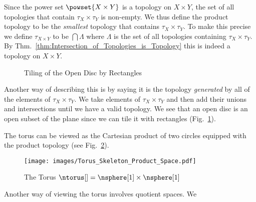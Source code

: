 \documentclass{book}                                                           %
\begin{document}
                Since the power set $\powset{X\times{Y}}$ is a topology on
                $X\times{Y}$, the set of all topologies that contain
                $\tau_{X}\times\tau_{Y}$ is non-empty. We thus define the
                product topology to be the \textit{smallest} topology that
                contains $\tau_{X}\times\tau_{Y}$. To make this precise we
                define $\tau_{X\times{Y}}$ to be $\bigcap\Lambda$ where
                $\Lambda$ is the set of all topologies containing
                $\tau_{X}\times\tau_{Y}$. By
                Thm.~\ref{thm:Intersection_of_Topologies_is_Topology} this is
                indeed a topology on $X\times{Y}$.%
                \begin{figure}[H]
                    \centering
                    \captionsetup{type=figure}
                    \resizebox{!}{0.8\height}{%
                    }
                    \caption{Tiling of the Open Disc by Rectangles}
                    \label{fig:Tiling_Open_Disc_by_Rectangles}
                \end{figure}
                Another way of describing this is by saying it is the topology
                \textit{generated} by all of the elements of
                $\tau_{X}\times\tau_{Y}$. We take elements of
                $\tau_{X}\times\tau_{Y}$ and then add their unions and
                intersections until we have a valid topology. We see that an
                open disc is an open subset of the plane since we can tile it
                with rectangles (Fig.~\ref{fig:Tiling_Open_Disc_by_Rectangles}).
                \begin{example}
                    The torus can be viewed as the Cartesian product of two
                    circles equipped with the product topology
                    (see Fig.~\ref{fig:Torus_as_Prod_Space}).
                \end{example}
                \begin{figure}[H]
                    \centering
                    \captionsetup{type=figure}
                    \texttt{[image: images/Torus\_Skeleton\_Product\_Space.pdf]}
                    \caption{The Torus $\ntorus[]=\nsphere[1]\times\nsphere[1]$}
                    \label{fig:Torus_as_Prod_Space}
                \end{figure}
                Another way of viewing the torus involves quotient spaces. We
\end{document}
